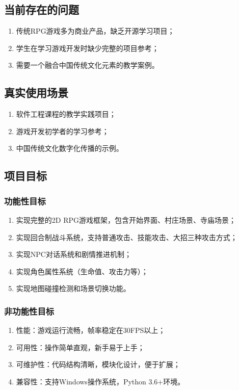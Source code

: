 \documentclass[a4paper,12pt]{article}
\begin{document}
\subsection{当前存在的问题}
\begin{enumerate}[label=(\arabic*)]
    \item 传统RPG游戏多为商业产品，缺乏开源学习项目；
    \item 学生在学习游戏开发时缺少完整的项目参考；
    \item 需要一个融合中国传统文化元素的教学案例。
\end{enumerate}

\subsection{真实使用场景}
\begin{enumerate}[label=(\arabic*)]
    \item 软件工程课程的教学实践项目；
    \item 游戏开发初学者的学习参考；
    \item 中国传统文化数字化传播的示例。
\end{enumerate}

\subsection{项目目标}

\subsubsection{功能性目标}
\begin{enumerate}[label=(\arabic*)]
    \item 实现完整的2D RPG游戏框架，包含开始界面、村庄场景、寺庙场景；
    \item 实现回合制战斗系统，支持普通攻击、技能攻击、大招三种攻击方式；
    \item 实现NPC对话系统和剧情推进机制；
    \item 实现角色属性系统（生命值、攻击力等）；
    \item 实现地图碰撞检测和场景切换功能。
\end{enumerate}

\subsubsection{非功能性目标}
\begin{enumerate}[label=(\arabic*)]
    \item 性能：游戏运行流畅，帧率稳定在30FPS以上；
    \item 可用性：操作简单直观，新手易于上手；
    \item 可维护性：代码结构清晰，模块化设计，便于扩展；
    \item 兼容性：支持Windows操作系统，Python 3.6+环境。
\end{enumerate}
\end{document}
